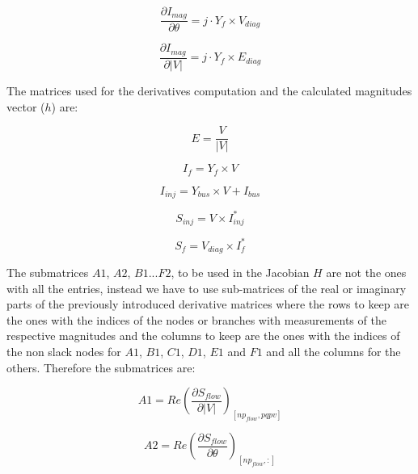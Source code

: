 \documentclass[nols,a4paper,twoside,notoc,fleqn]{tufte-book}
\begin{document}
\begin{equation}\frac{\partial I_{mag}}{\partial \theta} = j \cdot Y_f \times V_{diag} 
\end{equation}

\begin{equation}\frac{\partial I_{mag}}{\partial |V|}=j \cdot Y_f \times E_{diag} 
\end{equation}

The matrices used for the derivatives computation and the calculated magnitudes vector ($h$) are:

\begin{equation}E=\frac{V}{|V|}\end{equation}  

\begin{equation}
I_f=Y_f \times V 
\label{eq:current_from}
\end{equation}

\begin{equation}
I_{inj}=Y_{bus}  \times  V + I_{bus}
\label{eq:current_inj}
\end{equation}

\begin{equation}
S_{inj} = V  \times  I_{inj}^*
\label{eq:power_injection}
\end{equation}

\begin{equation}
S_f = V_{diag} \times I_{f}^*
\label{eq:power_from}
\end{equation}

The submatrices $A1$, $A2$, $B1$...$F2$, to be used in the Jacobian $H$ are not the ones with all the entries, instead we have to use sub-matrices of the real or imaginary parts of the previously introduced derivative matrices where the rows to keep are the ones with the indices of the nodes or branches with measurements of the respective magnitudes and the columns to keep are the ones with the indices of the non slack nodes for $A1$, $B1$, $C1$, $D1$, $E1$ and $F1$ and all the columns for the others. Therefore the submatrices are:

\begin{equation}
A1 = Re\left(\frac{\partial S_{flow}}{\partial |V|}\right)_{[np_{flow}, pqpv]}
\end{equation}

\begin{equation}
A2 = Re\left(\frac{\partial S_{flow}}{\partial \theta}\right)_{[np_{flow}, :]}
\end{equation}
\end{document}
